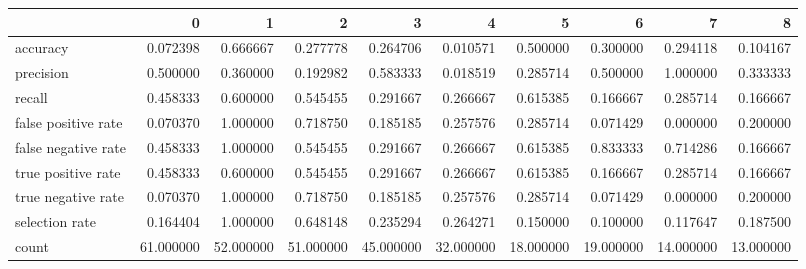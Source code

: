 \begin{tabular}{lrrrrrrrrr}
\toprule
{} &          0 &          1 &          2 &          3 &          4 &          5 &          6 &          7 &          8 \\
\midrule
accuracy            &   0.072398 &   0.666667 &   0.277778 &   0.264706 &   0.010571 &   0.500000 &   0.300000 &   0.294118 &   0.104167 \\
precision           &   0.500000 &   0.360000 &   0.192982 &   0.583333 &   0.018519 &   0.285714 &   0.500000 &   1.000000 &   0.333333 \\
recall              &   0.458333 &   0.600000 &   0.545455 &   0.291667 &   0.266667 &   0.615385 &   0.166667 &   0.285714 &   0.166667 \\
false positive rate &   0.070370 &   1.000000 &   0.718750 &   0.185185 &   0.257576 &   0.285714 &   0.071429 &   0.000000 &   0.200000 \\
false negative rate &   0.458333 &   1.000000 &   0.545455 &   0.291667 &   0.266667 &   0.615385 &   0.833333 &   0.714286 &   0.166667 \\
true positive rate  &   0.458333 &   0.600000 &   0.545455 &   0.291667 &   0.266667 &   0.615385 &   0.166667 &   0.285714 &   0.166667 \\
true negative rate  &   0.070370 &   1.000000 &   0.718750 &   0.185185 &   0.257576 &   0.285714 &   0.071429 &   0.000000 &   0.200000 \\
selection rate      &   0.164404 &   1.000000 &   0.648148 &   0.235294 &   0.264271 &   0.150000 &   0.100000 &   0.117647 &   0.187500 \\
count               &  61.000000 &  52.000000 &  51.000000 &  45.000000 &  32.000000 &  18.000000 &  19.000000 &  14.000000 &  13.000000 \\
\bottomrule
\end{tabular}
